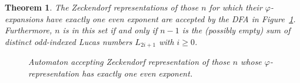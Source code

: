 \documentclass[10pt,a4paper]{amsart}
\newtheorem{theorem}{Theorem}
\begin{document}
\begin{theorem}
The Zeckendorf representations of those $n$ for which their $\varphi$-expansions have exactly one even exponent are accepted by the DFA
in Figure~\ref{fig7}.  Furthermore,
$n$ is in this set if and only if
$n-1$ is the (possibly empty) sum of distinct odd-indexed Lucas numbers $L_{2i+1}$ with $i \geq 0$.
\begin{figure}[H]
\begin{center}

\end{center}
\caption{Automaton accepting Zeckendorf representation of those $n$ whose $\varphi$-representation has exactly one even exponent.}
\label{fig7}
\end{figure}
\label{them7}
\end{theorem}
\end{document}
